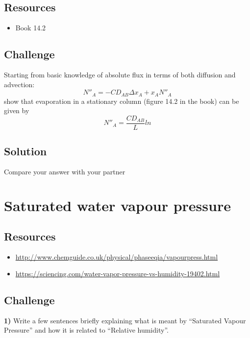 \subsection*{Resources}
\begin{itemize}
    \item Book 14.2
\end{itemize}

\subsection*{Challenge}
Starting from basic knowledge of absolute flux in terms of both diffusion and advection:
\begin{equation}
    N''_A = -C D_{AB} \Delta x_A + x_A N''_A
\end{equation}
show that evaporation in a stationary column (figure 14.2 in the book) can be given by
\begin{equation}
    N''_A = \frac{C D_{AB}}{L} ln
\end{equation}


\subsection*{Solution}
Compare your answer with your partner




\newpage
\section{Saturated water vapour pressure}

\subsection*{Resources}
\begin{itemize}
    \item \url{http://www.chemguide.co.uk/physical/phaseeqia/vapourpress.html}
    \item \url{https://sciencing.com/water-vapor-pressure-vs-humidity-19402.html}
\end{itemize}

\subsection*{Challenge}
\textbf{1)} Write a few sentences briefly explaining what is meant by ``Saturated Vapour Pressure'' and how it is related to ``Relative humidity''.

